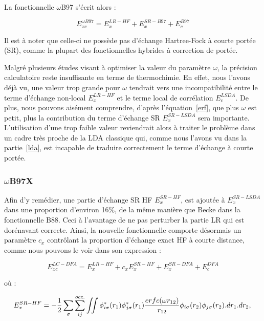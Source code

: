 La fonctionnelle $\omega$B97\cite{chai2008long} s'écrit alors :

\begin{equation}
E_{xc}^{\omega B97} = E_{x}^{LR-HF} + E_{x}^{SR-B97} + E_{c}^{B97}
\end{equation}

Il est à noter que celle-ci ne possède pas d'échange Hartree-Fock à courte portée (SR), comme la plupart des fonctionnelles hybrides à correction de portée.

Malgré plusieurs études visant à optimiser la valeur du paramètre $\omega$, la précision calculatoire reste insuffisante en terme de thermochimie. En effet, nous l'avons déjà vu, une valeur trop grande pour $\omega$ tendrait vers une incompatibilité entre le terme d'échange non-local $E_{x}^{LR-HF}$ et le terme local de corrélation $E_{c}^{LSDA}$. De plus, nous pouvons aisément comprendre, d'après l'équation~\ref{erf}, que plus $\omega$ est petit, plus la contribution du terme d'échange SR $E_{x}^{SR-LSDA}$ sera importante. L'utilisation d'une trop faible valeur  reviendrait alors à traiter le problème dans un cadre très proche de la LDA classique qui, comme nous l'avons vu dans la partie~\ref{lda}, est incapable de traduire correctement le terme d'échange à courte portée.

\subsubsection{$\omega$B97X}

Afin d'y remédier, une partie d'échange SR HF $E_{x}^{SR-HF}$, est ajoutée à $E_{x}^{SR-LSDA}$ dans une proportion d'environ 16\%,  de la même manière que Becke dans la fonctionnelle B88. Ceci à l'avantage de ne pas perturber la partie LR qui est dorénavant correcte. Ainsi, la nouvelle fonctionnelle comporte désormais un paramètre $c_{x}$ contrôlant la proportion d'échange exact HF à courte distance, comme nous pouvons le voir dans son expression :

\begin{equation}
E_{xc}^{LC-DFA} = E_{x}^{LR-HF} + c_{x}E_{x}^{SR-HF} + E_{x}^{SR-DFA} + E_{c}^{DFA}
\end{equation}

\noindent où :

\begin{equation}
E_{x}^{SR-HF} = -\frac{1}{2} \sum_{\sigma} \sum_{ij}^{occ.} \iint \phi_{i \sigma}^{*}(r_{1}) \phi_{j \sigma}^{*}(r_{1}) \frac{erfc(\omega r_{12})}{r_{12}} \phi_{i \sigma}(r_{2}) \phi_{j \sigma}(r_{2}).dr_{1}.dr_{2}, \\
\end{equation}

